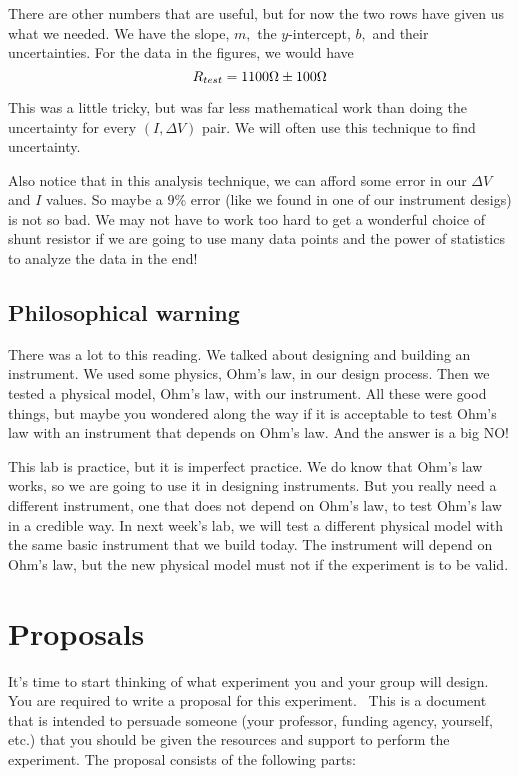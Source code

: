 There are other numbers that are useful, but for now the two rows have given
us what we needed. We have the slope, $m,$ the $y$-intercept, $b,$ and their
uncertainties. For the data in the figures, we would have 
\begin{equation*}
R_{test}=1100\unit{%
\Omega%
}\pm 100\unit{%
\Omega%
}
\end{equation*}

This was a little tricky, but was far less mathematical work than doing the
uncertainty for every $\left( I,\Delta V\right) $ pair. We will often use
this technique to find uncertainty.

Also notice that in this analysis technique, we can afford some error in our 
$\Delta V$ and $I$ values. So maybe a $9\%$ error (like we found in one of
our instrument desigs) is not so bad. We may not have to work too hard to
get a wonderful choice of shunt resistor if we are going to use many data
points and the power of statistics to analyze the data in the end!

\subsection{Philosophical warning}

There was a lot to this reading. We talked about designing and building an
instrument. We used some physics, Ohm's law, in our design process. Then we
tested a physical model, Ohm's law, with our instrument. All these were good
things, but maybe you wondered along the way if it is acceptable to test
Ohm's law with an instrument that depends on Ohm's law. And the answer is a
big NO!

This lab is practice, but it is imperfect practice. We do know that Ohm's
law works, so we are going to use it in designing instruments. But you
really need a different instrument, one that does not depend on Ohm's law,
to test Ohm's law in a credible way. In next week's lab, we will test a
different physical model with the same basic instrument that we build today.
The instrument will depend on Ohm's law, but the new physical model must not
if the experiment is to be valid.

\section{Proposals}

It's time to start thinking of what experiment you and your group will
design. You are required to write a proposal for this experiment. \ This is
a document that is intended to persuade someone (your professor, funding
agency, yourself, etc.) that you should be given the resources and support
to perform the experiment. The proposal consists of the following parts:

